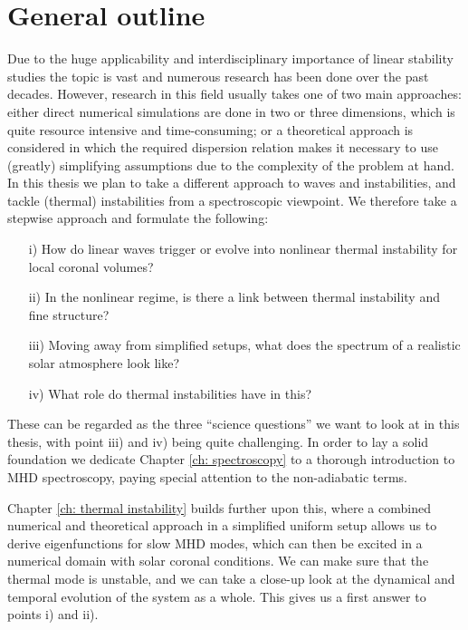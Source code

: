 \section{General outline}
Due to the huge applicability and interdisciplinary importance of linear stability studies the topic is vast and numerous research has been done over the past decades. However, research in this field usually takes one of two main approaches: either direct numerical simulations are done in two or three dimensions, which is quite resource intensive and time-consuming; or a theoretical approach is considered in which the required dispersion relation makes it necessary to use (greatly) simplifying assumptions due to the complexity of the problem at hand. In this thesis we plan to take a different approach to waves and instabilities, and tackle (thermal) instabilities from a spectroscopic viewpoint. We therefore take a stepwise approach and formulate the following:
\begin{enumerate}
  \item[i)] How do linear waves trigger or evolve into nonlinear thermal instability for local coronal volumes?
  \item[ii)] In the nonlinear regime, is there a link between thermal instability and fine structure?
  \item[iii)] Moving away from simplified setups, what does the spectrum of a realistic solar atmosphere look like?
  \item[iv)] What role do thermal instabilities have in this?
\end{enumerate}

These can be regarded as the three ``science questions'' we want to look at in this thesis, with point iii) and iv)  being quite challenging. In order to lay a solid foundation we dedicate Chapter \ref{ch: spectroscopy} to a thorough introduction to MHD spectroscopy, paying special attention to the non-adiabatic terms.

Chapter \ref{ch: thermal instability} builds further upon this, where a combined numerical and theoretical approach in a simplified uniform setup allows us to derive eigenfunctions for slow MHD modes, which can then be excited in a numerical domain with solar coronal conditions. We can make sure that the thermal mode is unstable, and we can take a close-up look at the dynamical and temporal evolution of the system as a whole. This gives us a first answer to points i) and ii).

